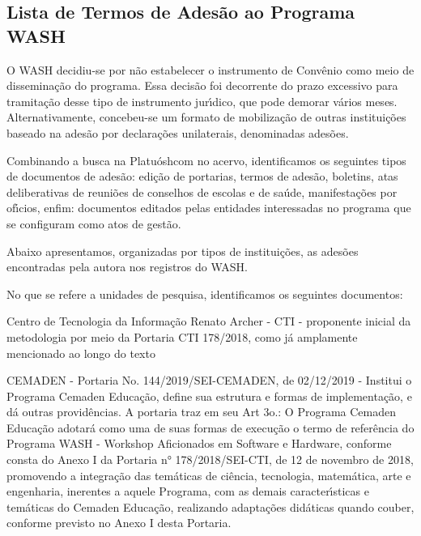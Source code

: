 \documentclass[
12pt,		%
openright,	%
twoside,  %
a4paper,			%
chapter=TITLE,		%
english,			%
french,				%
spanish,			%
brazil				%
]{USPSC-classe/USPSC}
\begin{document}
\subsection[Lista de Termos de Ades\~ao ao Programa WASH]{Lista de Termos de Ades\~ao ao Programa WASH}\label{Lista de Termos de Ades\~ao ao Programa WASH}
O WASH decidiu-se por n\~ao estabelecer  o instrumento de Conv\^enio como meio de dissemina\c{c}\~ao do programa. Essa decis\~ao foi decorrente do prazo excessivo para tramita\c{c}\~ao desse tipo de instrumento jur\'{\i}dico, que pode demorar v\'arios meses. Alternativamente, concebeu-se um formato de mobiliza\c{c}\~ao de outras institui\c{c}\~oes baseado na ades\~ao por declara\c{c}\~oes  unilaterais, denominadas \textquotedbl ades\~oes\textquotedbl .








Combinando a busca na \textquotedbl Platu\'osh\textquotedbl  com no acervo, identificamos os seguintes tipos de documentos de ades\~ao:  edi\c{c}\~ao de portarias, termos de ades\~ao, boletins, atas deliberativas de reuni\~oes de conselhos de escolas e de sa\'ude, manifesta\c{c}\~oes por of\'{\i}cios, enfim: documentos editados pelas entidades interessadas no programa que se configuram como atos de gest\~ao.








Abaixo apresentamos, organizadas por tipos de institui\c{c}\~oes, as ades\~oes encontradas pela autora nos registros do WASH.








No que se refere a \textquotedbl unidades de pesquisa\textquotedbl , identificamos os seguintes documentos:









\begin{alineas}
\item Centro de Tecnologia da Informa\c{c}\~ao Renato Archer - CTI - proponente inicial da metodologia por meio da Portaria CTI 178/2018, como j\'a amplamente mencionado ao longo do texto
\item CEMADEN - Portaria No. 144/2019/SEI-CEMADEN, de 02/12/2019 - Institui o Programa Cemaden Educa\c{c}\~ao, define sua estrutura e formas de implementa\c{c}\~ao, e d\'a outras provid\^encias. A portaria traz em seu Art 3o.: O Programa Cemaden Educa\c{c}\~ao adotar\'a como uma de suas formas de execu\c{c}\~ao o termo de refer\^encia do Programa WASH - Workshop Aficionados em Software e Hardware, conforme consta do Anexo I da Portaria n° 178/2018/SEI-CTI, de 12 de novembro de 2018, promovendo a integra\c{c}\~ao das tem\'aticas de ci\^encia, tecnologia, matem\'atica, arte e engenharia, inerentes a aquele Programa, com as demais caracter\'{\i}sticas e tem\'aticas do Cemaden Educa\c{c}\~ao, realizando adapta\c{c}\~oes did\'aticas quando couber, conforme previsto no Anexo I desta Portaria.
\end{alineas}
\end{document}
